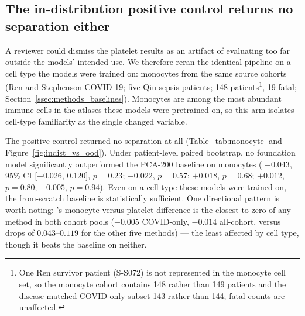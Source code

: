 \subsection{The in-distribution positive control returns no separation either}
\label{ssec:r4_monocyte}

A reviewer could dismiss the platelet results as an artifact of evaluating too
far outside the models' intended use. We therefore reran the identical pipeline
on a cell type the models were trained on: monocytes from the same source
cohorts (Ren and Stephenson COVID-19; five Qiu sepsis patients; 148
patients\footnote{One Ren survivor patient (S-S072) is not represented in
the monocyte cell set, so the monocyte cohort contains 148 rather than 149
patients and the disease-matched COVID-only subset 143 rather than 144;
fatal counts are unaffected.}, 19 fatal; Section~\ref{ssec:methods_baselines}). Monocytes are among the most
abundant immune cells in the atlases these models were pretrained on, so this
arm isolates cell-type familiarity as the single changed variable.

The positive control returned no separation at all
(Table~\ref{tab:monocyte} and Figure~\ref{fig:indist_vs_ood}). Under
patient-level paired bootstrap, no foundation model significantly outperformed
the PCA-200 baseline on monocytes ( $+0.043$, 95\% CI [$-0.026$,
0.120], $p = 0.23$;  $+0.022$, $p = 0.57$; 
$+0.018$, $p = 0.68$;  $+0.012$, $p = 0.80$;  $+0.005$,
$p = 0.94$). Even on a cell type these models were trained on, the from-scratch
baseline is statistically sufficient. One directional pattern is worth
noting: 's monocyte-versus-platelet difference is the closest to
zero of any method in both cohort pools ($-0.005$ COVID-only, $-0.014$
all-cohort, versus drops of $0.043$--$0.119$ for the other five methods) ---
the least affected by cell type, though it beats the baseline on neither.

